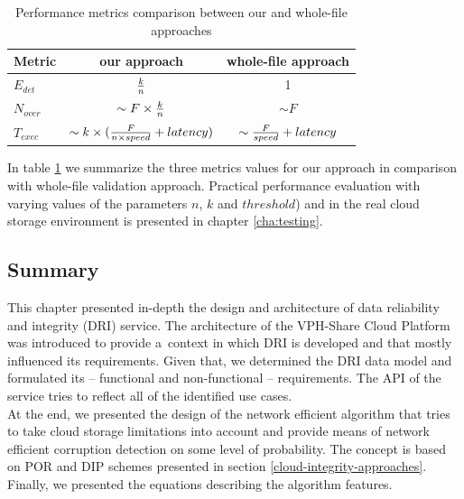 \begin{table}[h!]
\centering
\begin{tabular}{|l||c|c|}
	\hline
	Metric     & our approach                                           & whole-file approach \\ \hline \hline
	$E_{det}$  & ${k \over n}$                                          & 1 \\ \hline
	$N_{over}$ & $\sim F \times {k \over n}$                            & $\sim F$ \\ \hline
	$T_{exec}$ & $\sim k \times ({F \over {n \times speed}} + latency)$ & $\sim {F \over speed} + latency$ \\ \hline
\end{tabular}
\caption{Performance metrics comparison between our and whole-file approaches}
\label{tab:metrics-comparison}
\end{table}

In table \ref{tab:metrics-comparison} we summarize the three metrics values
for our approach in comparison with whole-file validation approach. Practical
performance evaluation with varying values of the parameters $n$, $k$ and
$threshold$) and in the real cloud storage environment is presented in chapter
\ref{cha:testing}.

\subsection{Summary}
This chapter presented in-depth the design and architecture of data reliability and
integrity (DRI) service. The architecture of the VPH-Share Cloud Platform was introduced
to provide a~context in which DRI is developed and that mostly influenced its requirements.
Given that, we determined the DRI data model and formulated its -- functional and non-functional
-- requirements. The API of the service tries to reflect all of the identified use cases.\\

At the end, we presented the design of the network efficient algorithm that
tries to take cloud storage limitations into account and provide means of network efficient
corruption detection on some level of probability. The concept is based on POR and DIP schemes presented in section
\ref{cloud-integrity-approaches}. Finally, we presented the equations describing the algorithm features.

